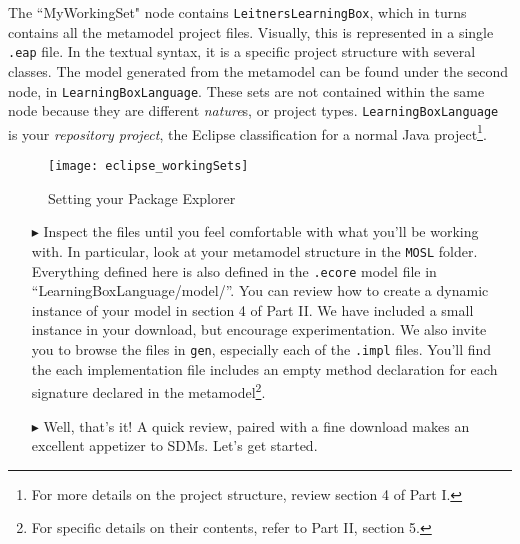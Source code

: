 The ``MyWorkingSet" node contains \texttt{LeitnersLearningBox}, which in turns contains all the metamodel project files. Visually, this is represented in a
single \texttt{.eap} file. In the textual syntax, it is a specific project structure with several classes. The model generated from the metamodel can be found
under the second node, in \texttt{LearningBoxLanguage}. These sets are not contained within the same node because they are different \emph{nature}s, or
project types. \texttt{LearningBoxLanguage} is your \emph{repository project}, the Eclipse classification for a normal Java project\footnote{For more details
on the project structure, review section 4 of Part I.}. 

\begin{figure}[htbp]
	\centering
  \texttt{[image: eclipse\_workingSets]}
	\caption{Setting your Package Explorer}
	\label{fig:workingSets}
\end{figure}
\FloatBarrier

\begin{itemize}
\item[$\blacktriangleright$] Inspect the files until you feel comfortable with what you'll be working with. In particular, look at your metamodel structure in
the \texttt{MOSL} folder. Everything defined here is also defined in the \texttt{.ecore} model file in ``LearningBoxLanguage/model/''. You can review how to
create a dynamic instance of your model in section 4 of Part II. We have included a small instance in your download, but encourage experimentation. We also
invite you to browse the files in \texttt{gen}, especially each of the \texttt{.impl} files. You'll find the each implementation file includes an
empty method declaration for each signature declared in the metamodel\footnote{For specific details on their contents, refer to Part II, section 5.}.

\item[$\blacktriangleright$] Well, that's it! A quick review, paired with a fine download makes an excellent appetizer to SDMs. Let's get started.

\end{itemize}
